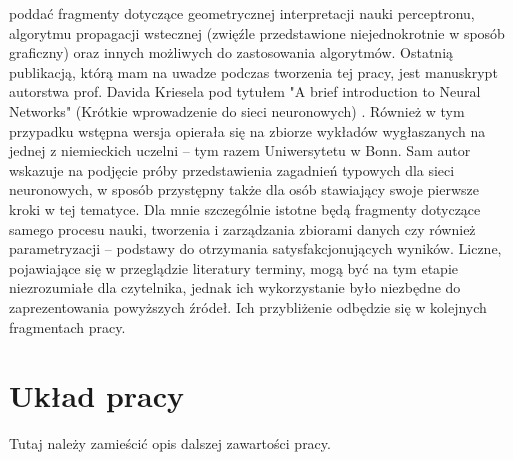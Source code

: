 poddać fragmenty dotyczące geometrycznej interpretacji nauki perceptronu, algorytmu propagacji wstecznej (zwięźle przedstawione niejednokrotnie w sposób graficzny) oraz innych możliwych do zastosowania algorytmów. Ostatnią publikacją, którą mam na uwadze podczas tworzenia tej pracy, jest manuskrypt autorstwa prof. Davida Kriesela pod tytułem "A brief introduction to Neural Networks" (Krótkie wprowadzenie do sieci neuronowych) \cite{Kri07}. Również w tym przypadku wstępna wersja opierała się na zbiorze wykładów wygłaszanych na jednej z niemieckich uczelni -- tym razem Uniwersytetu w Bonn. Sam autor wskazuje na podjęcie próby przedstawienia zagadnień typowych dla sieci neuronowych, w sposób przystępny także dla osób stawiający swoje pierwsze kroki w tej tematyce. Dla mnie szczególnie istotne będą fragmenty dotyczące samego procesu nauki, tworzenia i zarządzania zbiorami danych czy również parametryzacji -- podstawy do otrzymania satysfakcjonujących wyników. Liczne, pojawiające się w przeglądzie literatury terminy, mogą być na tym etapie niezrozumiałe dla czytelnika, jednak ich wykorzystanie było niezbędne do zaprezentowania powyższych źródeł. Ich przybliżenie odbędzie się w kolejnych fragmentach pracy.

\section{Układ pracy}
\iffalse
{\color{red} Tutaj należy zamieścić opis dalszej zawartości pracy.}

